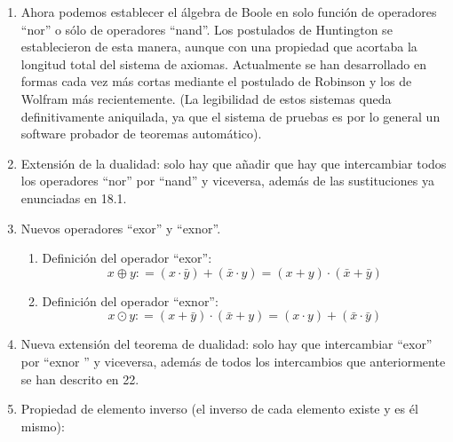 \begin{enumerate}
\begin{enumerate}
\begin{enumerate}
\begin{enumerate}
        \begin{enumerate}
        \def\labelenumv{\arabic{enumv}.}
        \tightlist
        \item
          \[{{x \cdot y} = {({x\uparrow y})}}\uparrow{({x\uparrow y})}\]
        \item
          \[{{x + y} = {({x\uparrow x})}}\uparrow{({y\uparrow y})}\]
        \item
          \[\overline{x} = {x\uparrow x}\]
        \end{enumerate}
      \end{enumerate}
    \item
      Ahora podemos establecer el álgebra de Boole en solo función de
      operadores ``nor'' o sólo de operadores ``nand''. Los postulados
      de Huntington se establecieron de esta manera, aunque con una
      propiedad que acortaba la longitud total del sistema de axiomas.
      Actualmente se han desarrollado en formas cada vez más cortas
      mediante el postulado de Robinson y los de Wolfram más
      recientemente. (La legibilidad de estos sistemas queda
      definitivamente aniquilada, ya que el sistema de pruebas es por lo
      general un software probador de teoremas automático).
    \item
      Extensión de la dualidad: solo hay que añadir que hay que
      intercambiar todos los operadores ``nor'' por ``nand'' y
      viceversa, además de las sustituciones ya enunciadas en 18.1.
    \item
      Nuevos operadores ``exor'' y ``exnor''.

      \begin{enumerate}
      \def\labelenumiv{\arabic{enumiv}.}
      \tightlist
      \item
        Definición del operador ``exor'':
        \[{x \oplus y}{: =}{{{({x \cdot \bar{y}})} + {({\bar{x} \cdot y})}} = {{({x + y})} \cdot {({\bar{x} + \bar{y}})}}}\]
      \item
        Definición del operador ``exnor'':
        \[{x \odot y}{: =}{{{({x + \bar{y}})} \cdot {({\bar{x} + y})}} = {{({x \cdot y})} + {({\bar{x} \cdot \bar{y}})}}}\]
      \end{enumerate}
    \item
      Nueva extensión del teorema de dualidad: solo hay que intercambiar
      ``exor'' por ``ex\-nor '' y viceversa, además de todos los
      intercambios que anteriormente se han des\-crito en 22.
    \item
      Propiedad de elemento inverso (el inverso de cada elemento existe
      y es él mismo):


\end{enumerate}
\end{enumerate}
\end{enumerate}
